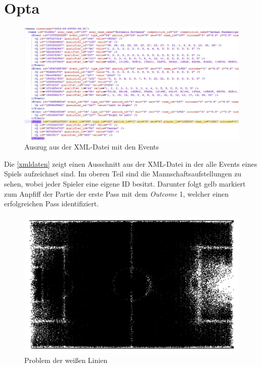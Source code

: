 \newcommand{\waInputStyles}{\texttt{se-wa-input-styles-v097.tex}}

\chapter{Opta}

\begin{figure}[H]
\centering
\includegraphics[scale=0.52]{se-wa-jpg/daten}
\caption{Auszug aus der XML-Datei mit den Events}
\label{xmldaten}
\end{figure}

Die \vref{xmldaten} zeigt einen Ausschnitt aus der XML-Datei in der alle Events eines Spiels aufzeichnet sind. Im oberen Teil sind die Mannschaftsaufstellungen zu sehen, wobei jeder Spieler eine eigene ID besitzt. Darunter folgt gelb markiert zum Anpfiff der Partie der erste Pass mit dem \textit{Outcome} 1, welcher einen erfolgreichen Pass identifiziert. 

\begin{figure}
\centering
\includegraphics[scale=0.3]{se-wa-jpg/lines}
\caption[Problem der weißen Linien]{Problem der weißen Linien}
\label{lines}
\end{figure}

